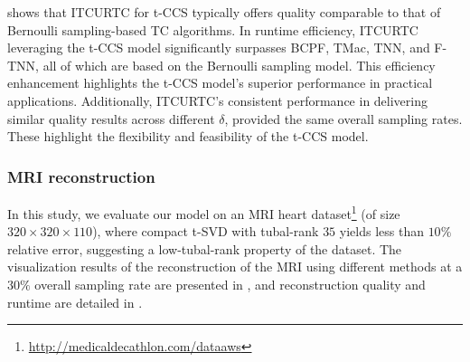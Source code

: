 \documentclass[twoside,12pt]{article}
\begin{document}
 shows that ITCURTC for t-CCS typically offers quality comparable to that of Bernoulli sampling-based TC algorithms. In runtime efficiency, ITCURTC leveraging the t-CCS model significantly surpasses BCPF, TMac, TNN, and F-TNN, all of which are based on the Bernoulli sampling model. This efficiency enhancement highlights the t-CCS model's superior performance in practical applications. Additionally, ITCURTC's consistent performance in delivering similar quality results across different $\delta$, provided the same overall sampling rates. These highlight the flexibility and feasibility of the t-CCS model. 

\subsubsection{\textnormal{MRI reconstruction}}
In this study, we evaluate our model on an MRI heart dataset\footnote{\url{http://medicaldecathlon.com/dataaws}} (of size \(320\times 320 \times 110\)), where compact t-SVD with tubal-rank \(35\) yields less than \(10\%\) relative error, suggesting a low-tubal-rank property of the dataset. The visualization results of the reconstruction of the MRI  using different methods at a $30\%$ overall sampling rate are presented in , and reconstruction quality and runtime are detailed in . 
\end{document}

